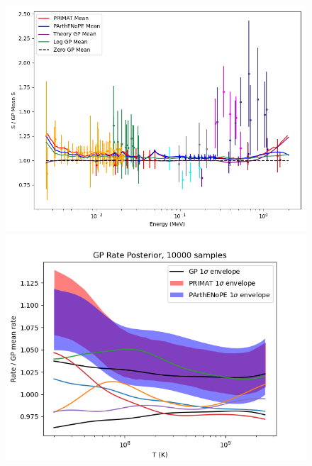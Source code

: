 \documentclass[%
 reprint,
superscriptaddress,
nofootinbib,
 amsmath,amssymb,
 aps,
 pra,
]{revtex4-2}
\begin{document}
\begin{figure}
\begin{minipage}{.48\textwidth}
		\includegraphics[width=\linewidth]{Figures/dphe3g_S_comp.png}	
	\end{minipage}
	\hspace{0mm}
	\begin{minipage}{.48\textwidth}
    		\centering
		\includegraphics[width=\linewidth]{Figures/dphe3g_rate.png}	
	\end{minipage}

\end{figure}
\end{document}
